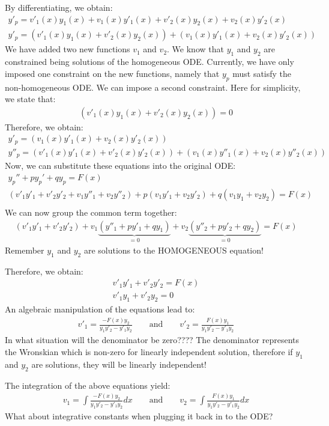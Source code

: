 By differentiating, we obtain:
\begin {align*}
y'_p=v'_1(x) y_1(x)+v_1(x) y'_1(x) +v'_2(x) y_2(x)+v_2(x) y'_2(x)\\
y'_p=\left(v'_1(x) y_1(x)+v'_2(x) y_2(x)\right)+\left(v_1(x) y'_1(x)+v_2(x) y'_2(x)\right)
\end {align*}
We have added two new functions $v_1$ and $v_2$. We know that $y_1$ and $y_2$ are constrained being solutions of the homogeneous ODE. Currently, we have only imposed one constraint on the new functions, namely that $y_p$ must satisfy the non-homogeneous ODE. We can impose a second constraint. Here for simplicity, we state that:
\begin {align*}
\left(v'_1(x) y_1(x)+v'_2(x) y_2(x)\right)=0
\end {align*}
Therefore, we obtain:
\begin {align*}
y'_p=\left(v_1(x) y'_1(x)+v_2(x) y'_2(x)\right)\\
y''_p=\left(v'_1(x) y'_1(x)+v'_2(x) y'_2(x)\right) +\left(v_1(x) y''_1(x)+v_2(x) y''_2(x)\right)
\end {align*}
Now, we can substitute these equations into the original ODE:
\begin {align*}
y_p''+p  y_p' + q y_p=F(x)\\
\left(v'_1  y'_1 +v'_2  y'_2  +v_1  y''_1 +v_2  y''_2 \right) +p \left(v_1  y'_1 +v_2  y'_2 \right)+q (v_1  y_1  +v_2  y_2) =F(x)\\
\end {align*}
We can now group the common term together:
\begin {align*}
\left(v'_1 y'_1 +v'_2 y'_2 \right) + v_1 \underbrace{\left(y''_1 +p y'_1+q y_1 \right)}_{=0} + v_2 \underbrace{\left( y''_2 +py'_2 + qy_2 \right)}_{=0}=F(x)
\end {align*}
Remember $y_1$ and $y_2$ are solutions to the HOMOGENEOUS equation!

Therefore, we obtain:
\begin {align*}
v'_1 y'_1 +v'_2 y'_2 =F(x)\\
v'_1 y_1 +v'_2 y_2 =0
\end {align*}
An algebraic manipulation of the equations lead to:
\begin {align*}
v'_1 =\frac{-F(x) y_2}{y_1y'_2-y'_1y_2} \qquad \text{and}\qquad v'_2 =\frac{F(x) y_1}{y_1y'_2-y'_1y_2}
\end {align*}
In what situation will the denominator be zero????
The denominator represents the Wronskian which is non-zero for linearly independent solution, therefore if $y_1$ and $y_2$ are solutions, they will be linearly independent!


The integration of the above equations yield:
\begin {align*}
v_1 =\int\frac{-F(x) y_2}{y_1y'_2-y'_1y_2} dx \qquad \text{and}\qquad v_2 =\int \frac{F(x) y_1}{y_1y'_2-y'_1y_2}dx
\end {align*}
What about integrative constants when plugging it back in to the ODE? 

\updateinfo[October 30, 2018]